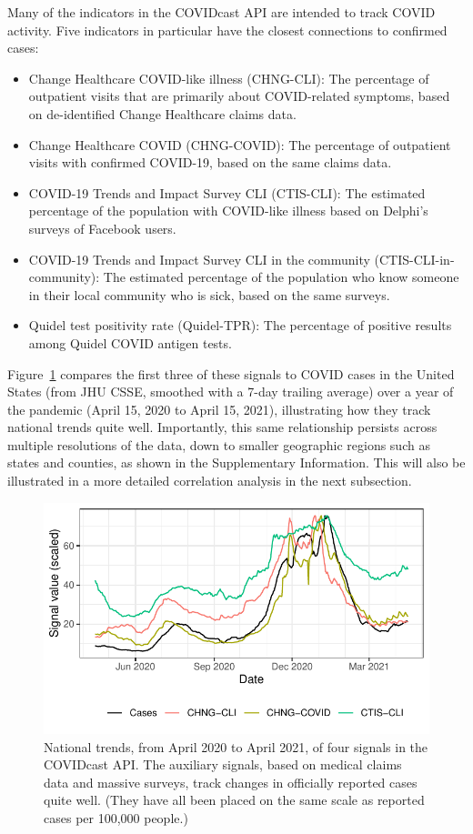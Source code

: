 \documentclass[9pt,twocolumn,twoside,lineno]{pnas-new}
\begin{document}
Many of the indicators in the COVIDcast API are intended to track COVID
activity. Five indicators in particular have the closest connections to
confirmed cases:

\begin{itemize}
\item Change Healthcare COVID-like illness (CHNG-CLI): The percentage of
  outpatient visits that are primarily about COVID-related symptoms, based on
  de-identified Change Healthcare claims data.
\item Change Healthcare COVID (CHNG-COVID): The percentage of outpatient visits
  with confirmed COVID-19, based on the same claims data.
\item COVID-19 Trends and Impact Survey CLI (CTIS-CLI): The estimated percentage
  of the population with COVID-like illness based on Delphi's surveys of
  Facebook users.
\item COVID-19 Trends and Impact Survey CLI in the community
  (CTIS-CLI-in-community): The estimated percentage of the population who know
  someone in their local community who is sick, based on the same surveys.
\item Quidel test positivity rate (Quidel-TPR): The percentage of positive
  results among Quidel COVID antigen tests.
\end{itemize}

Figure~\ref{fig:time_trends_national} compares the first three of these signals
to COVID cases in the United States (from JHU CSSE, smoothed with a 7-day
trailing average) over a year of the pandemic (April 15, 2020 to April 15,
2021), illustrating how they track national trends quite well. Importantly, this
same relationship persists across multiple resolutions of the data, down to
smaller geographic regions such as states and counties, as shown in the
Supplementary Information. This will also be illustrated in a more detailed
correlation analysis in the next subsection.

\begin{figure}[t]
  \includegraphics[width=\columnwidth]{fig/time_trends_national.pdf}
  \caption{National trends, from April 2020 to April 2021, of four signals in
    the COVIDcast API. The auxiliary signals, based on medical claims data and
    massive surveys, track changes in officially reported cases quite
    well. (They have all been placed on the same scale as reported cases per
    100,000 people.)}
  \label{fig:time_trends_national}
\end{figure}
\end{document}
